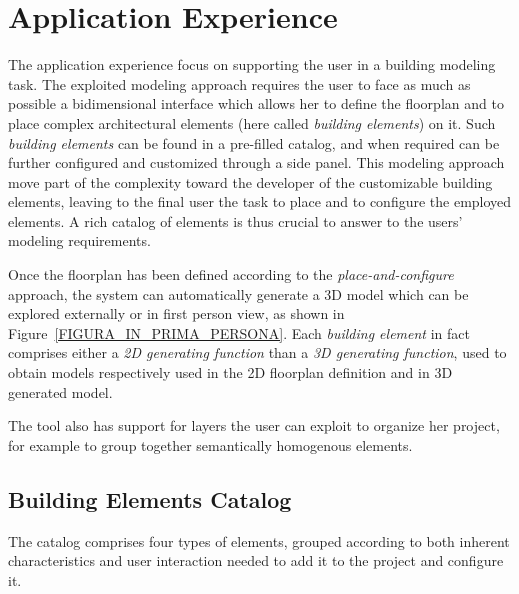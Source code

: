 \section{Application Experience}\label{sec:application}

The application experience focus on supporting the user in a building modeling task. The exploited modeling approach requires the user to face as much as possible a bidimensional interface which allows her to define the floorplan and to place complex architectural elements (here called \emph{building elements}) on it. Such \emph{building elements} can be found in a pre-filled catalog, and when required can be further configured and customized through a side panel. This modeling approach move part of the complexity toward the developer of the customizable building elements, leaving to the final user the task to place and to configure the employed elements. A rich catalog of elements is thus crucial to answer to the users' modeling requirements.

Once the floorplan has been defined according to the \emph{place-and-configure} approach, the system can automatically generate a 3D model which can be explored externally or in first person view, as shown in Figure~\ref{FIGURA_IN_PRIMA_PERSONA}. Each  \emph{building element} in fact comprises either a \emph{2D generating function} than a \emph{3D generating function}, used to obtain models respectively used in the 2D floorplan definition and in 3D generated model.

The tool also has support for layers the user can exploit to organize her project, for example to group together semantically homogenous elements.

\subsection{Building Elements Catalog}\label{ssec:elements}

The catalog comprises four types of elements, grouped according to both inherent characteristics and user interaction needed to add it to the project and configure it.

